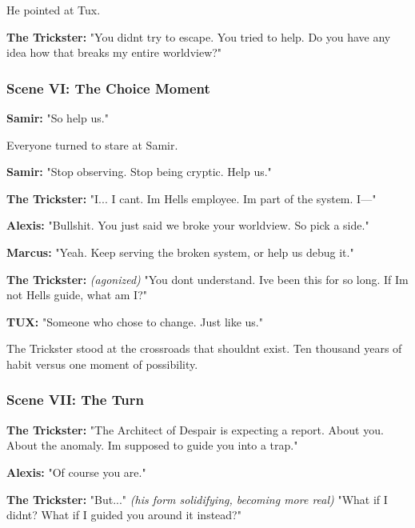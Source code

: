 He pointed at Tux.

\textbf{The Trickster:} "You didn\textquotesingle t try to escape. You tried to help. Do you have any idea how that breaks my entire worldview?"

\bookdivider

\subsubsection{Scene VI: The Choice Moment}\label{scene-vi-the-choice-moment}

\textbf{Samir:} "So help us."

Everyone turned to stare at Samir.

\textbf{Samir:} "Stop observing. Stop being cryptic. Help us."

\textbf{The Trickster:} "I... I can\textquotesingle t. I\textquotesingle m Hell\textquotesingle s employee. I\textquotesingle m part of the system. I---"

\textbf{Alexis:} "Bullshit. You just said we broke your worldview. So pick a side."

\textbf{Marcus:} "Yeah. Keep serving the broken system, or help us debug it."

\textbf{The Trickster:} \emph{(agonized)} "You don\textquotesingle t understand. I\textquotesingle ve been this for so long. If I\textquotesingle m not Hell\textquotesingle s guide, what am I?"

\textbf{TUX:} "Someone who chose to change. Just like us."

The Trickster stood at the crossroads that shouldn\textquotesingle t exist. Ten thousand years of habit versus one moment of possibility.

\bookdivider

\subsubsection{Scene VII: The Turn}\label{scene-vii-the-turn}

\textbf{The Trickster:} "The Architect of Despair is expecting a report. About you. About the \textquotesingle anomaly.\textquotesingle{} I\textquotesingle m supposed to guide you into a trap."

\textbf{Alexis:} "Of course you are."

\textbf{The Trickster:} "But..." \emph{(his form solidifying, becoming more real)} "What if I didn\textquotesingle t? What if I guided you around it instead?"

